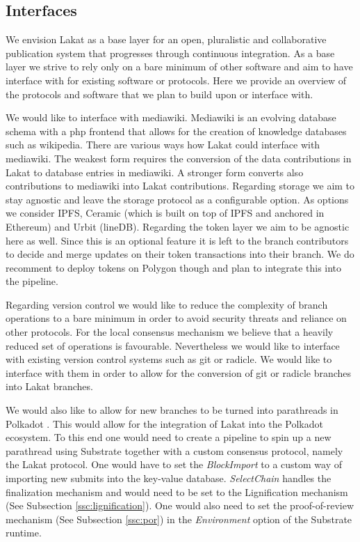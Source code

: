 \subsection{Interfaces}
\label{ssc:interfaces}

We envision Lakat as a base layer for an open, pluralistic and collaborative publication system that progresses through continuous integration. As a base layer we strive to rely only on a bare minimum of other software and aim to have interface with for existing software or protocols. Here we provide an overview of the protocols and software that we plan to build upon or interface with.

We would like to interface with mediawiki. Mediawiki is an evolving database schema with a php frontend that allows for the creation of knowledge databases such as wikipedia. There are various ways how Lakat could interface with mediawiki. The weakest form requires the conversion of the data contributions in Lakat to database entries in mediawiki. A stronger form converts also contributions to mediawiki into Lakat contributions. Regarding storage we aim to stay agnostic and leave the storage protocol as a configurable option. As options we consider IPFS, Ceramic (which is built on top of IPFS and anchored in Ethereum) and Urbit (lineDB). Regarding the token layer we aim to be agnostic here as well. Since this is an optional feature it is left to the branch contributors to decide and merge updates on their token transactions into their branch. We do recomment to deploy tokens on Polygon though and plan to integrate this into the pipeline.

Regarding version control we would like to reduce the complexity of branch operations to a bare minimum in order to avoid security threats and reliance on other protocols. For the local consensus mechanism we believe that a heavily reduced set of operations is favourable. Nevertheless we would like to interface with existing version control systems such as git or radicle. We would like to interface with them in order to allow for the conversion of git or radicle branches into Lakat branches.

We would also like to allow for new branches to be turned into parathreads in Polkadot \cite{wood2016polkadot}. This would allow for the integration of Lakat into the Polkadot ecosystem. To this end one would need to create a pipeline to spin up a new parathread using Substrate together with a custom consensus protocol, namely the Lakat protocol. One would have to set the \textit{BlockImport} to a custom way of importing new submits into the key-value database. \textit{SelectChain} handles the finalization mechanism and would need to be set to the Lignification mechanism (See Subsection \ref{ssc:lignification}). One would also need to set the proof-of-review mechanism (See Subsection \ref{ssc:por}) in the \textit{Environment} option of the Substrate runtime.
